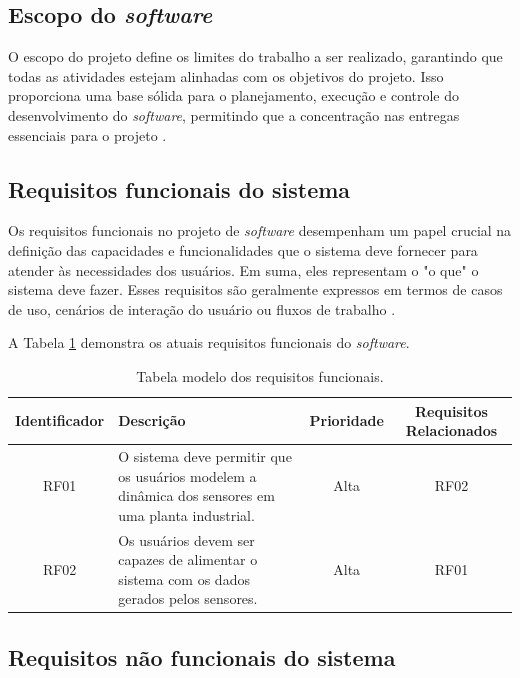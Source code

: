 \subsection{Escopo do \textit{software}}

O escopo do projeto define os limites do trabalho a ser realizado, garantindo que todas as atividades estejam alinhadas com os objetivos do projeto. Isso proporciona uma base sólida para o planejamento, execução e controle do desenvolvimento do \textit{software}, permitindo que a concentração nas entregas essenciais para o projeto \cite{softwareeng}.
    
\subsection{Requisitos funcionais do sistema}

Os requisitos funcionais no projeto de \textit{software} desempenham um papel crucial na definição das capacidades e funcionalidades que o sistema deve fornecer para atender às necessidades dos usuários. Em suma, eles representam o "o que" o sistema deve fazer. Esses requisitos são geralmente expressos em termos de casos de uso, cenários de interação do usuário ou fluxos de trabalho \cite{softwareengreq}.
        
A Tabela \ref{tab:req_funcional} demonstra os atuais requisitos funcionais do \textit{software}.

\begin{table}[htbp]
\begin{tabularx}{\linewidth}{|c|X|c|c|} \hline
\textbf{Identificador} & 
\textbf{Descrição} & 
\textbf{Prioridade} &
\textbf{Requisitos Relacionados}\\ \hline
RF01 & 
O sistema deve permitir que os usuários modelem a dinâmica dos sensores em uma planta industrial. & 
Alta & 
RF02 \\ \hline
RF02 & 
Os usuários devem ser capazes de alimentar o sistema com os dados gerados pelos sensores. & 
Alta & 
RF01 \\ \hline
\end{tabularx}

\caption{Tabela modelo dos requisitos funcionais.}
\label{tab:req_funcional}
\end{table}

\subsection{Requisitos não funcionais do sistema}

